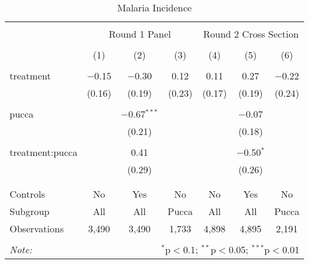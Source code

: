 
\begin{table}[!htbp] \centering 
  \caption{Malaria Incidence} 
  \label{tbl:Malaria Incidence} 
\begin{tabular}{@{\extracolsep{5pt}}lcccccc} 
\\[-1.8ex]\hline 
\hline \\[-1.8ex] 
 & \multicolumn{3}{c}{Round 1 Panel} & \multicolumn{3}{c}{Round 2 Cross Section} \\ 
\\[-1.8ex] & (1) & (2) & (3) & (4) & (5) & (6)\\ 
\hline \\[-1.8ex] 
 treatment & $-$0.15 & $-$0.30 & 0.12 & 0.11 & 0.27 & $-$0.22 \\ 
  & (0.16) & (0.19) & (0.23) & (0.17) & (0.19) & (0.24) \\ 
  & & & & & & \\ 
 pucca &  & $-$0.67$^{***}$ &  &  & $-$0.07 &  \\ 
  &  & (0.21) &  &  & (0.18) &  \\ 
  & & & & & & \\ 
 treatment:pucca &  & 0.41 &  &  & $-$0.50$^{*}$ &  \\ 
  &  & (0.29) &  &  & (0.26) &  \\ 
  & & & & & & \\ 
\hline \\[-1.8ex] 
Controls & No & Yes & No & No & Yes & No \\ 
Subgroup & All & All & Pucca & All & All & Pucca \\ 
Observations & 3,490 & 3,490 & 1,733 & 4,898 & 4,895 & 2,191 \\ 
\hline 
\hline \\[-1.8ex] 
\textit{Note:}  & \multicolumn{6}{r}{$^{*}$p$<$0.1; $^{**}$p$<$0.05; $^{***}$p$<$0.01} \\ 
\end{tabular} 
\end{table} 
